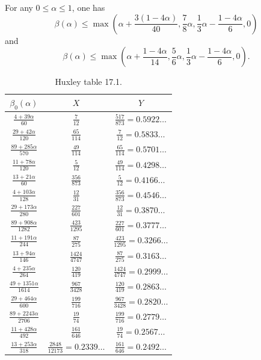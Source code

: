 \begin{theorem}\label{sargos_1995}\cite[Th\'eor\`eme 2.4, Lemme 2.6]{sargos_points_1995}  For any $0 \leq \alpha \leq 1$, one has
$$ \beta(\alpha) \leq \max\left(\alpha + \frac{3(1-4\alpha)}{40}, \frac{7}{8} \alpha, \frac{1}{3}\alpha - \frac{1-4\alpha}{6}, 0\right)$$
and
$$ \beta(\alpha) \leq \max\left(\alpha + \frac{1-4\alpha}{14}, \frac{5}{6} \alpha, \frac{1}{3}\alpha - \frac{1-4\alpha}{6}, 0\right).$$
\end{theorem}

\literature
{}

\begin{table}[ht]
    \caption{Huxley table 17.1.}
    \centering
    \renewcommand{\arraystretch}{1.2}
    \begin{tabular}{|c|c|c|}
    \hline
    $\beta_0(\alpha)$  & $X$ & $Y$ \\
    \hline
    $\frac{4+39\alpha}{60}$ & $\frac{7}{12}$ & $\frac{517}{873} = 0.5922\dots$ \\
    \hline
    $\frac{29+42\alpha}{120}$ & $\frac{65}{114}$ & $\frac{7}{12} = 0.5833\dots$ \\
    \hline
    $\frac{89+285\alpha}{570}$ & $\frac{49}{114}$ & $\frac{65}{114} = 0.5701\dots$ \\
    \hline
    $\frac{11+78\alpha}{120}$ & $\frac{5}{12}$ & $\frac{49}{114} = 0.4298\dots$ \\
    \hline
    $\frac{13+21\alpha}{60}$ & $\frac{356}{873}$ & $\frac{5}{12} = 0.4166\dots$ \\
    \hline
    $\frac{4+103\alpha}{128}$ & $\frac{12}{31}$ & $\frac{356}{873} = 0.4546\dots$ \\
    \hline
    $\frac{29+173\alpha}{280}$ & $\frac{227}{601}$ & $\frac{12}{31} = 0.3870\dots$ \\
    \hline
    $\frac{89+908\alpha}{1282}$ & $\frac{423}{1295}$ & $\frac{227}{601} = 0.3777\dots$ \\
    \hline
    $\frac{11+191\alpha}{244}$ & $\frac{87}{275}$ & $\frac{423}{1295} = 0.3266\dots$ \\
    \hline
    $\frac{13+94\alpha}{146}$ & $\frac{1424}{4747}$ & $\frac{87}{275} = 0.3163\dots$\\
    \hline
    $\frac{4+235\alpha}{264}$ & $\frac{120}{419}$ & $\frac{1424}{4747}=0.2999\dots$ \\
    \hline
    $\frac{49+1351\alpha}{1614}$ & $\frac{967}{3428}$ & $\frac{120}{419} = 0.2863\dots$ \\
    \hline
    $\frac{29+464\alpha}{600}$ & $\frac{199}{716}$ & $\frac{967}{3428} = 0.2820\dots$ \\
    \hline
    $\frac{89+2243\alpha}{2706}$ & $\frac{19}{74}$ & $\frac{199}{716} = 0.2779\dots$ \\
    \hline
    $\frac{11+428\alpha}{492}$ & $\frac{161}{646}$ & $\frac{19}{74} = 0.2567\dots$ \\
    \hline
    $\frac{13+253\alpha}{318}$ & $\frac{2848}{12173} =0.2339\dots$ & $\frac{161}{646} = 0.2492\dots$ \\
    \hline
    \end{tabular}
    \end{table}\label{huxley-table-1}

